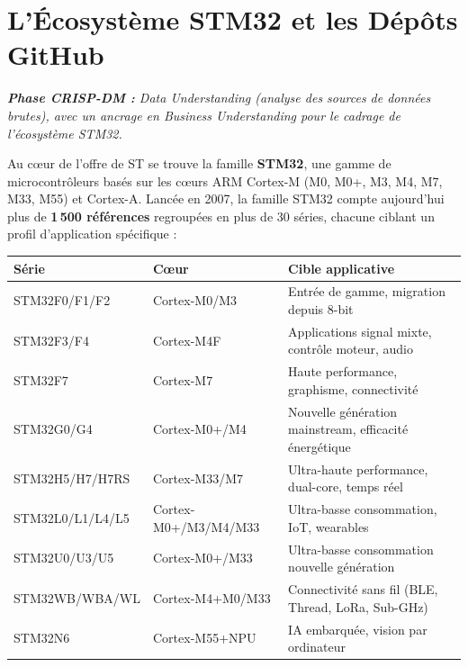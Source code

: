 \documentclass[12pt,a4paper]{report}
\begin{document}
\section{L'Écosystème STM32 et les Dépôts GitHub}
\label{sec:ecosysteme}

\textit{\small\textbf{\textcolor{stblue}{Phase CRISP-DM :}} Data Understanding (analyse des sources de données brutes), avec un ancrage en Business Understanding pour le cadrage de l'écosystème STM32.}\par\smallskip

Au cœur de l'offre de ST se trouve la famille \textbf{STM32}, une gamme de microcontrôleurs basés sur les cœurs ARM Cortex-M (M0, M0+, M3, M4, M7, M33, M55) et Cortex-A. Lancée en 2007, la famille STM32 compte aujourd'hui plus de \textbf{1\,500 références} regroupées en plus de 30 séries, chacune ciblant un profil d'application spécifique :

\begin{longtable}{p{2.5cm}p{3cm}p{7.5cm}}
\toprule
\textbf{Série} & \textbf{Cœur} & \textbf{Cible applicative} \\
\midrule
STM32F0/F1/F2 & Cortex-M0/M3 & Entrée de gamme, migration depuis 8-bit \\
STM32F3/F4 & Cortex-M4F & Applications signal mixte, contrôle moteur, audio \\
STM32F7 & Cortex-M7 & Haute performance, graphisme, connectivité \\
STM32G0/G4 & Cortex-M0+/M4 & Nouvelle génération mainstream, efficacité énergétique \\
STM32H5/H7/H7RS & Cortex-M33/M7 & Ultra-haute performance, dual-core, temps réel \\
STM32L0/L1/L4/L5 & Cortex-M0+/M3/M4/M33 & Ultra-basse consommation, IoT, wearables \\
STM32U0/U3/U5 & Cortex-M0+/M33 & Ultra-basse consommation nouvelle génération \\
STM32WB/WBA/WL & Cortex-M4+M0/M33 & Connectivité sans fil (BLE, Thread, LoRa, Sub-GHz) \\
STM32N6 & Cortex-M55+NPU & IA embarquée, vision par ordinateur \\
\bottomrule
\end{longtable}
\end{document}
